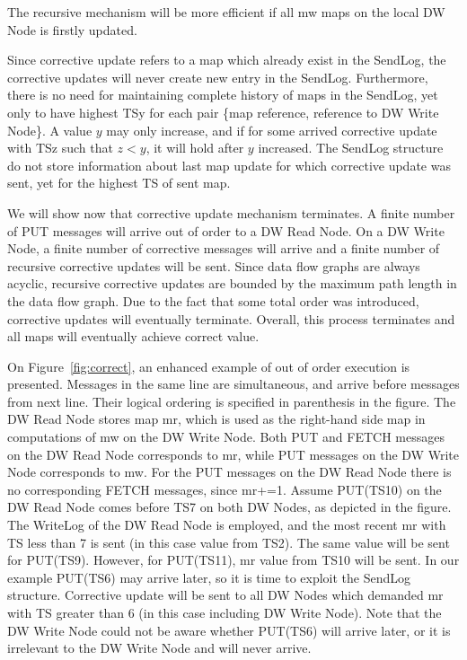\documentclass{sig-semester}
\begin{document}
The recursive mechanism will be more efficient if all mw maps on the local DW Node is firstly updated.

Since corrective update refers to a map which already exist in the SendLog, the corrective updates will never create new entry in the SendLog. Furthermore, there is no need for maintaining complete history of maps in the SendLog, yet only to have highest TSy for each pair \{map reference, reference to DW Write Node\}. A value $y$ may only increase, and if for some arrived corrective update with TSz such that $z<y$, it will hold after $y$ increased. The SendLog structure do not store information about last map update for which corrective update was sent, yet for the highest TS of sent map.

We will show now that corrective update mechanism terminates. A finite number of PUT messages will arrive out of order to a DW Read Node. On a DW Write Node, a finite number of corrective messages will arrive and a finite number of recursive corrective updates will be sent. Since data flow graphs are always acyclic, recursive corrective updates are bounded by the maximum path length in the data flow graph. Due to the fact that some total order was introduced, corrective updates will eventually terminate. Overall, this process terminates and all maps will eventually achieve correct value.
 
On Figure~\ref{fig:correct}, an enhanced example of out of order execution is presented. Messages in the same line are simultaneous, and arrive before messages from next line. Their logical ordering is specified in parenthesis in the figure. The DW Read Node stores map mr, which is used as the right-hand side map in computations of mw on the DW Write Node. Both PUT and FETCH messages on the DW Read Node corresponds to mr, while PUT messages on the DW Write Node corresponds to mw. For the PUT messages on the DW Read Node there is no corresponding FETCH messages, since mr+=1. Assume PUT(TS10) on the DW Read Node comes before TS7 on both DW Nodes, as depicted in the figure. The WriteLog of the DW Read Node is employed, and the most recent mr with TS less than 7 is sent (in this case value from TS2). The same value will be sent for PUT(TS9). However, for PUT(TS11), mr value from TS10 will be sent. In our example PUT(TS6) may arrive later, so it is time to exploit the SendLog structure. Corrective update will be sent to all DW Nodes which demanded mr with TS greater than 6 (in this case including DW Write Node). Note that the DW Write Node could not be aware whether PUT(TS6) will arrive later, or it is irrelevant to the DW Write Node and will never arrive.
\end{document}
